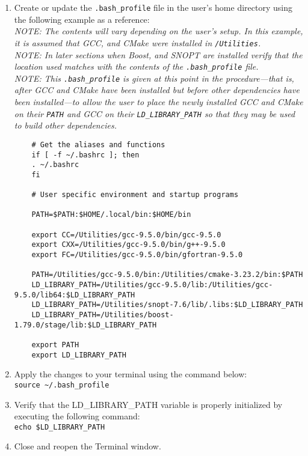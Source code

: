 \begin{enumerate}
	\item Create or update the \texttt{.bash\_profile} file in the user's home directory using the following example as a reference:\\
	\textit{NOTE: The contents will vary depending on the user's setup. In this example, it is assumed that \ac{GCC}, and CMake were installed in \texttt{/Utilities}.}\\
	\textit{NOTE: In later sections when  Boost, and \ac{SNOPT} are installed verify that the location used matches with the contents of the \texttt{.bash\_profile} file.}\\
	\textit{NOTE: This \texttt{.bash\_profile} is given at this point in the procedure---that is, after \ac{GCC} and CMake have been installed but before other dependencies have been installed---to allow the user to place the newly installed \ac{GCC} and CMake on their \texttt{PATH} and \ac{GCC} on their \texttt{LD\_LIBRARY\_PATH} so that they may be used to build other dependencies.}

	\begin{verbatim}
	# Get the aliases and functions
	if [ -f ~/.bashrc ]; then
	. ~/.bashrc
	fi
	
	# User specific environment and startup programs
	
	PATH=$PATH:$HOME/.local/bin:$HOME/bin
	
	export CC=/Utilities/gcc-9.5.0/bin/gcc-9.5.0
	export CXX=/Utilities/gcc-9.5.0/bin/g++-9.5.0
	export FC=/Utilities/gcc-9.5.0/bin/gfortran-9.5.0
	
	PATH=/Utilities/gcc-9.5.0/bin:/Utilities/cmake-3.23.2/bin:$PATH
	LD_LIBRARY_PATH=/Utilities/gcc-9.5.0/lib:/Utilities/gcc-9.5.0/lib64:$LD_LIBRARY_PATH
	LD_LIBRARY_PATH=/Utilities/snopt-7.6/lib/.libs:$LD_LIBRARY_PATH
	LD_LIBRARY_PATH=/Utilities/boost-1.79.0/stage/lib:$LD_LIBRARY_PATH
	
	export PATH
	export LD_LIBRARY_PATH
	\end{verbatim}

	\item Apply the changes to your terminal using the command below: \\
	
	\verb|source ~/.bash_profile|
	
	\item Verify that the LD\_LIBRARY\_PATH variable is properly initialized by executing the following command: \\
	
	\texttt{echo \$LD\_LIBRARY\_PATH}
	
	\item Close and reopen the Terminal window.
\end{enumerate}